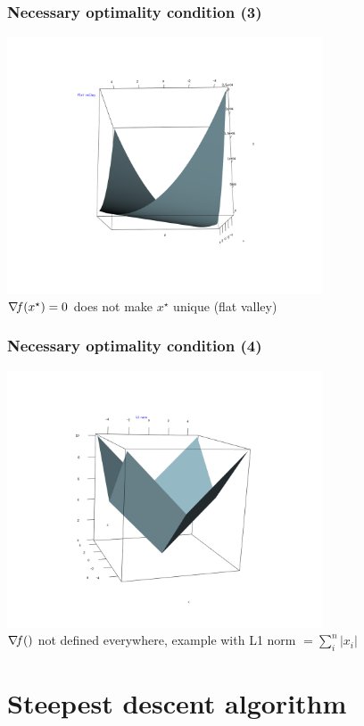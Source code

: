 \documentclass[12pt]{beamer}
\begin{document}
\begin{frame}
\frametitle{Necessary optimality condition (3)} 
\begin{center}
\includegraphics[width=0.7\textwidth]{flat_valley.png} \\
$\nabla\!{f}(x^\star) = 0$ does not make $x^\star$ unique (flat valley)
\end{center}
\end{frame}

\begin{frame}
\frametitle{Necessary optimality condition (4)} 
\begin{center}
\includegraphics[width=0.7\textwidth]{L1norm.png} \\
$\nabla\!{f}()$ not defined everywhere, example with L1 norm $= \sum_i^n \lvert x_i \rvert$
\end{center}
\end{frame}


\section{Steepest descent algorithm}
\end{document}
